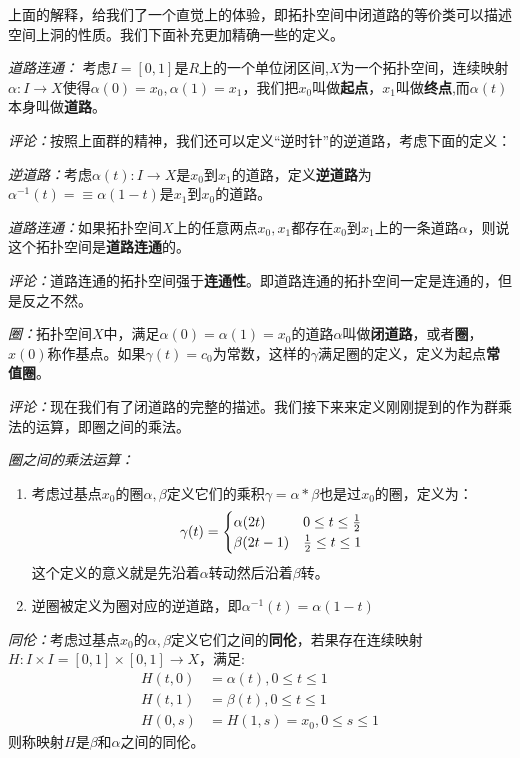 \documentclass[supercite]{HustGraduPaper}
\begin{document}
\begin{appendices}
		上面的解释，给我们了一个直觉上的体验，即拓扑空间中闭道路的等价类可以描述空间上洞的性质。我们下面补充更加精确一些的定义。
		
		\textit{道路连通：} 考虑$I = [0,1]$是$R$上的一个单位闭区间,$X$为一个拓扑空间，连续映射$\alpha: I \to X$使得$\alpha(0) = x_0, \alpha(1) = x_1$，我们把$x_0$叫做\textbf{起点}，$x_1$叫做\textbf{终点},而$\alpha(t)$本身叫做\textbf{道路}。
		
		\textit{评论：}按照上面群的精神，我们还可以定义“逆时针”的逆道路，考虑下面的定义：
		
		\textit{逆道路：}考虑$\alpha(t): I\to X$是$x_0$到$x_1$的道路，定义\textbf{逆道路}为$\alpha^{-1}(t) =  \equiv \alpha(1-t)$是$x_1$到$x_0$的道路。
		
		\textit{道路连通：}如果拓扑空间$X$上的任意两点$x_0, x_1$都存在$x_0$到$x_1$上的一条道路$\alpha$，则说这个拓扑空间是\textbf{道路连通}的。
		
		\textit{评论：}道路连通的拓扑空间强于\textbf{连通性}。即道路连通的拓扑空间一定是连通的，但是反之不然。
		
		\textit{圈：}拓扑空间$X$中，满足$\alpha(0) = \alpha(1) = x_0$的道路$\alpha$叫做\textbf{闭道路}，或者\textbf{圈}，$x(0)$称作基点。如果$\gamma(t) = c_0$为常数，这样的$\gamma$满足圈的定义，定义为起点\textbf{常值圈}。
		
		\textit{评论：}现在我们有了闭道路的完整的描述。我们接下来来定义刚刚提到的作为群乘法的运算，即圈之间的乘法。
		
		\textit{圈之间的乘法运算：} 
		\begin{enumerate}
			\item 考虑过基点$x_0$的圈$\alpha,\beta$定义它们的乘积$\gamma = \alpha * \beta$也是过$x_0$的圈，定义为：
			\begin{equation}
			\gamma(t)  = \begin{cases}
			\alpha(2t) &0\le t \le {1\over 2} \\
			\beta(2t-1)  &{1\over 2} \le t \le 1
			\end{cases}
			\end{equation}
			这个定义的意义就是先沿着$\alpha$转动然后沿着$\beta$转。
			\item 逆圈被定义为圈对应的逆道路，即$\alpha^{-1}(t) = \alpha(1-t)$
		\end{enumerate}
		
		\textit{同伦：}考虑过基点$x_0$的$\alpha, \beta$定义它们之间的\textbf{同伦}，若果存在连续映射$H: I \times I = [0,1] \times [0,1] \to X$，满足:
		\begin{equation}
		\begin{aligned}
		H(t,0) &= \alpha(t), 0\le t\le 1\\
		H(t,1) &= \beta(t),0\le t \le 1\\
		H(0,s)&=H(1,s) = x_0, 0\le s\le 1
		\end{aligned}
		\end{equation}
		则称映射$H$是$\beta$和$\alpha$之间的同伦。
		

\end{appendices}
\end{document}

